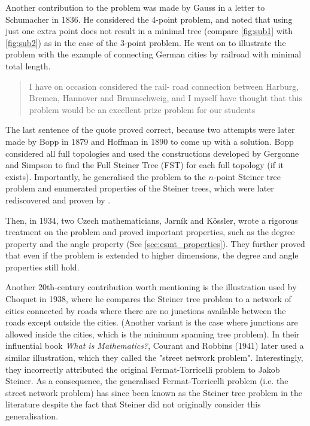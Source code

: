 \documentclass{l4proj}
\begin{document}
Another contribution to the problem was made by Gauss in a letter to Schumacher in 1836. He considered the 4-point problem, and noted that using just one extra point does not result in a minimal tree (compare \ref{fig:sub1} with \ref{fig:sub2}) as in the case of the 3-point problem. He went on to illustrate the problem with the example of connecting German cities by railroad with minimal total length.
\begin{quote}
    I have on occasion considered the rail- road connection between Harburg, Bremen, Hannover and Braunschweig, and I myself have thought that this problem would be an excellent prize problem for our students
\end{quote}

The last sentence of the quote proved correct, because two attempts were later made by Bopp in 1879 and Hoffman in 1890 to come up with a solution. Bopp considered all full topologies and used the constructions developed by Gergonne and Simpson to find the Full Steiner Tree (FST) for each full topology (if it exists). Importantly, he generalised the problem to the $n$-point Steiner tree problem and enumerated properties of the Steiner trees, which were later rediscovered and proven by \cite{Gilbert1968SteinerMT}.

Then, in 1934, two Czech mathematicians, Jarník and Kössler, wrote a rigorous treatment on the problem and proved important properties, such as the degree property and the angle property (See \ref{sec:esmt_properties}). They further proved that even if the problem is extended to higher dimensions, the degree and angle properties still hold.

Another 20th-century contribution worth mentioning is the illustration used by Choquet in 1938, where he compares the Steiner tree problem to a network of cities connected by roads where there are no junctions available between the roads except outside the cities. (Another variant is the case where junctions are allowed inside the cities, which is the minimum spanning tree problem). In their influential book \textit{What is Mathematics?}, Courant and Robbins (1941) later used a similar illustration, which they called the "street network problem". Interestingly, they incorrectly attributed the original Fermat-Torricelli problem to Jakob Steiner. As a consequence, the generalised Fermat-Torricelli problem (i.e. the street network problem) has since been known as the Steiner tree problem in the literature despite the fact that Steiner did not originally consider this generalisation.
\end{document}
